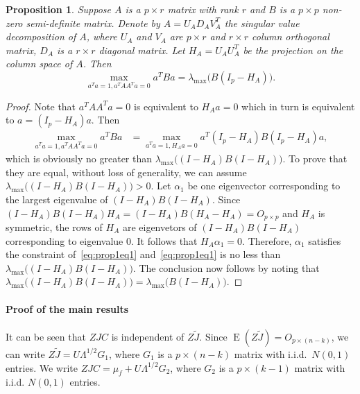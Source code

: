 \documentclass[review]{elsarticle}
\DeclareMathOperator{\myE}{E}
\theoremstyle{plain}
\newtheorem{proposition}{\quad\quad Proposition}
\theoremstyle{definition}
\theoremstyle{remark}
\begin{document}
\begin{proposition}\label{optProp}
    Suppose $A$ is a $p\times r$ matrix with rank $r$ and $B$ is a $p\times p$  non-zero semi-definite matrix.
    Denote by $A=U_A D_A V_A^T$ the singular value decomposition of $A$, where $U_A$ and $V_A$ are $p\times r$ and $r\times r$ column orthogonal matrix, $D_A$ is a $r\times r$ diagonal matrix.
    Let $H_A=U_A U_A^T$ be the projection on the column space of $A$.
    Then
    \begin{equation}
        \max_{a^T a=1, a^T A A^T a=0}a^T B a=
        \lambda_{\max}\big(B(I_p-H_A)\big).
    \end{equation}
\end{proposition}
\begin{proof}
    Note that $a^T A A^T a=0$ is equivalent to $H_A a=0$ which in turn is equivalent to $a= (I_p-H_A)a$.
    Then
    \begin{equation}\label{eq:prop1eq1}
        \begin{aligned}
        \max_{a^T a=1, a^T A A^T a=0}a^T B a
            &=
        \max_{a^T a=1, H_A a=0}a^T(I_p-H_A) B (I_p-H_A)a,
        \end{aligned}
    \end{equation}
    which is obviously no greater than $\lambda_{\max}\big((I-H_A)B(I-H_A)\big)$.
    To prove that they are equal,  without loss of generality, we can assume $\lambda_{\max}\big((I-H_A)B(I-H_A)\big)>0$.
    Let $\alpha_1$ be one eigenvector corresponding to the largest eigenvalue of $(I-H_A)B(I-H_A)$.
    Since $(I-H_A)B(I-H_A)H_A=(I-H_A)B(H_A-H_A)=O_{p\times p}$ and $H_A$ is symmetric, the rows of $H_A$ are eigenvetors of $(I-H_A)B(I-H_A)$ corresponding to eigenvalue $0$.
    It follows that $H_A\alpha_1=0$.
    Therefore, $\alpha_1$ satisfies the constraint of~\eqref{eq:prop1eq1} and~\eqref{eq:prop1eq1} is no less than $\lambda_{\max}\big((I-H_A)B(I-H_A)\big)$.
    The conclusion now follows by noting that $\lambda_{\max}\big((I-H_A)B(I-H_A)\big)=\lambda_{\max}\big( B(I-H_A)\big)$.
    
\end{proof}





\paragraph{Proof of the main results}

It can be seen that $ZJC$ is independent of ${Z\tilde{J}}$.
Since
$
\myE (Z\tilde{J}) = O_{p\times (n-k)}
$,
we can write
$
Z\tilde{J} = U\Lambda^{1/2} G_1
$,
where $G_1$ is a $p\times (n-k)$ matrix with i.i.d.\ $N(0,1)$ entries.
We write
$
ZJC = \mu_f + U\Lambda^{1/2} G_2
$, 
where $G_2$ is a $p\times (k-1)$ matrix with i.i.d. $N(0,1)$ entries.
\end{document}
